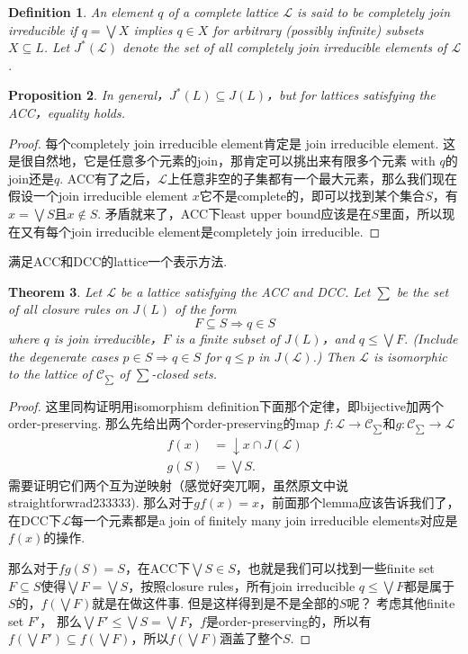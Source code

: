 \documentclass{article}
\newtheorem{theorem}{Theorem}[section]
\newtheorem{proposition}[theorem]{Proposition}
\newtheorem{definition}[theorem]{Definition}
\newcommand*{\xfunc}[4]{{#2}\colon{#3}{#1}{#4}}
\newcommand*{\func}[3]{\xfunc{\to}{#1}{#2}{#3}}
\newcommand\lattice{\mathcal{L}}
\begin{document}
\begin{definition}
\rm An element $q$ of a complete lattice $\lattice$ is said to be {\color{red} completely join irreducible} if $q = \bigvee X$ implies $q \in X$ for {\color{red} arbitrary (possibly infinite) subsets} $X \subseteq L$. Let $J^*(\lattice)$ denote the set of all completely join irreducible elements of $\lattice$. 
\end{definition}

\begin{proposition}
\rm In general，$J^{*}(L) \subseteq J(L)$，but for lattices satisfying the ACC，equality holds.
\end{proposition}

\begin{proof}
每个completely join irreducible element肯定是 join irreducible   element. 这是很自然地，它是任意多个元素的join，那肯定可以挑出来有限多个元素 with $q$的join还是$q$. ACC有了之后，$\lattice$上任意非空的子集都有一个最大元素，那么我们现在假设一个join irreducible element $x$它不是complete的，即可以找到某个集合$S$，有$x = \bigvee S$且$x \notin S$. 矛盾就来了，ACC下least upper bound应该是在$S$里面，所以现在又有每个join irreducible element是completely join irreducible.
\end{proof}


{\color{blue} 满足ACC和DCC的lattice一个表示方法}.

\begin{theorem}
\rm Let $\lattice$ be a lattice satisfying the ACC and DCC. Let $\sum$ be the set of all closure rules on $J(L)$ of the form
$$
F \subseteq S \Rightarrow q \in S
$$
where $q$ is join irreducible，$F$ is a finite subset of $J(L)$，and $q \leq \bigvee F$. (Include the degenerate cases $p \in S \Rightarrow q \in S$ for $q \leq p$ in $J(\lattice)$.) Then $\lattice$ is isomorphic to the lattice of $\mathcal{C}_{\sum}$ of $\sum$-closed sets.
\end{theorem}

\begin{proof}
这里同构证明用isomorphism definition下面那个定律，即bijective加两个order-preserving. 那么先给出两个order-preserving的map $\func{f}{\lattice}{\mathcal{C}_{\sum}}$和$\func{g}{\mathcal{C}_{\sum}}{\lattice}$
$$
\begin{aligned}
f(x) &= \downarrow x \cap J(\lattice)\\
g(S) &= \bigvee S.
\end{aligned}
$$
需要证明它们两个互为逆映射（感觉好突兀啊，虽然原文中说straightforwrad233333). 那么对于$gf(x) = x$，前面那个lemma应该告诉我们了，在DCC下$\lattice$每一个元素都是a join of finitely many join irreducible elements对应是$f(x)$的操作. 

那么对于$fg(S) = S$，在ACC下$\bigvee S \in S$，也就是我们可以找到一些finite set $F \subseteq S$使得$\bigvee F = \bigvee S$，按照closure rules，所有join irreducible $q \leq \bigvee F$都是属于$S$的，$f(\bigvee F)$就是在做这件事. 但是这样得到是不是全部的$S$呢？ 考虑其他finite set $F'$， 那么$\bigvee F' \leq \bigvee S = \bigvee F$，$f$是order-preserving的，所以有$f(\bigvee F') \subseteq f(\bigvee F)$，所以$f(\bigvee F)$涵盖了整个$S$.
\end{proof}
\end{document}
